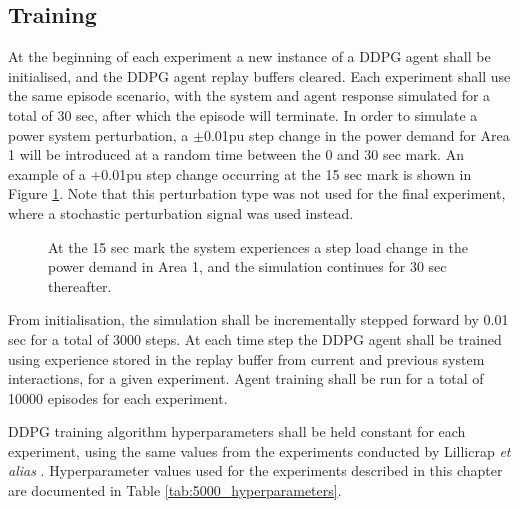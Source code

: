 \subsection{Training}\label{ssec:training}
At the beginning of each experiment a new instance of a DDPG agent shall be initialised, and the DDPG agent replay buffers cleared. Each experiment shall use the same episode scenario, with the system and agent response simulated for a total of 30 sec, after which the episode will terminate. In order to simulate a power system perturbation, a $\pm$0.01pu step change in the power demand for Area 1 will be introduced at a random time between the 0 and 30 sec mark. An example of a +0.01pu step change occurring at the 15 sec mark is shown in Figure \ref{fig:5001_demand_profile}. Note that this perturbation type was not used for the final experiment, where a stochastic perturbation signal was used instead.

\begin{figure}[h]
	\centering
	
	\caption[Preliminary investigation load demand step change]{At the 15 sec mark the system experiences a step load change in the power demand in Area 1, and the simulation continues for 30 sec thereafter.}
	\label{fig:5001_demand_profile}
\end{figure}

From initialisation, the simulation shall be incrementally stepped forward by 0.01 sec for a total of 3000 steps. At each time step the DDPG agent shall be trained using experience stored in the replay buffer from current and previous system interactions, for a given experiment. Agent training shall be run for a total of 10000 episodes for each experiment.

DDPG training algorithm hyperparameters shall be held constant for each experiment, using the same values from the experiments conducted by Lillicrap \textit{et alias} \cite{Lillicrap2015}. Hyperparameter values used for the experiments described in this chapter are documented in Table \ref{tab:5000_hyperparameters}.

